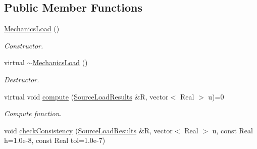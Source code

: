 \subsection*{Public Member Functions}
\begin{DoxyCompactItemize}
\item 
\hypertarget{classvoom_1_1_mechanics_load_aa9a143223cce6cd5447933f22d7774bd}{
\hyperlink{classvoom_1_1_mechanics_load_aa9a143223cce6cd5447933f22d7774bd}{MechanicsLoad} ()}
\label{classvoom_1_1_mechanics_load_aa9a143223cce6cd5447933f22d7774bd}

\begin{DoxyCompactList}\small\item\em Constructor. \item\end{DoxyCompactList}\item 
\hypertarget{classvoom_1_1_mechanics_load_ab9647011a664a948d92e1ef06b46e51b}{
virtual \hyperlink{classvoom_1_1_mechanics_load_ab9647011a664a948d92e1ef06b46e51b}{$\sim$MechanicsLoad} ()}
\label{classvoom_1_1_mechanics_load_ab9647011a664a948d92e1ef06b46e51b}

\begin{DoxyCompactList}\small\item\em Destructor. \item\end{DoxyCompactList}\item 
\hypertarget{classvoom_1_1_mechanics_load_a4444c7db1866e047875d59d00a71a37f}{
virtual void \hyperlink{classvoom_1_1_mechanics_load_a4444c7db1866e047875d59d00a71a37f}{compute} (\hyperlink{structvoom_1_1_mechanics_load_1_1_source_load_results}{SourceLoadResults} \&R, vector$<$ Real $>$ u)=0}
\label{classvoom_1_1_mechanics_load_a4444c7db1866e047875d59d00a71a37f}

\begin{DoxyCompactList}\small\item\em Compute function. \item\end{DoxyCompactList}\item 
\hypertarget{classvoom_1_1_mechanics_load_a29646009a692aa99169c75159b5089f4}{
void \hyperlink{classvoom_1_1_mechanics_load_a29646009a692aa99169c75159b5089f4}{checkConsistency} (\hyperlink{structvoom_1_1_mechanics_load_1_1_source_load_results}{SourceLoadResults} \&R, vector$<$ Real $>$ u, const Real h=1.0e-\/8, const Real tol=1.0e-\/7)}
\label{classvoom_1_1_mechanics_load_a29646009a692aa99169c75159b5089f4}


\end{DoxyCompactItemize}
